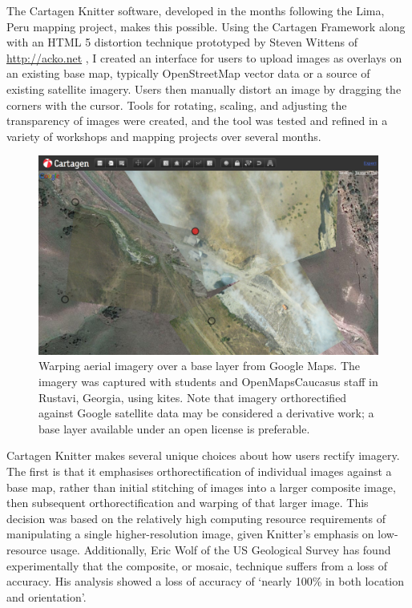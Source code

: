 \documentclass[11pt,oneside,notitlepage]{report}
\begin{document}
The Cartagen Knitter software, developed in the months following the Lima, Peru mapping project, makes this possible. Using the Cartagen Framework along with an HTML 5 distortion technique prototyped by Steven Wittens of \href{acko.net}{http://acko.net} \cite{wittens2008projective}, I created an interface for users to upload images as overlays on an existing base map, typically OpenStreetMap vector data or a source of existing satellite imagery. Users then manually distort an image by dragging the corners with the cursor. Tools for rotating, scaling, and adjusting the transparency of images were created, and the tool was tested and refined in a variety of workshops and mapping projects over several months. 

\begin{figure}[h]
  \begin{center}
	\includegraphics[width=1\textwidth]{images/cartagen-in-action-rustavi.png}
	\caption{Warping aerial imagery over a base layer from Google Maps. The imagery was captured with students and OpenMapsCaucasus staff in Rustavi, Georgia, using kites. Note that imagery orthorectified against Google satellite data may be considered a derivative work; a base layer available under an open license is preferable.}
  \end{center}
\end{figure}

Cartagen Knitter makes several unique choices about how users rectify imagery. The first is that it emphasises orthorectification of individual images against a base map, rather than initial stitching of images into a larger composite image, then subsequent orthorectification and warping of that larger image. This decision was based on the relatively high computing resource requirements of manipulating a single higher-resolution image, given Knitter's emphasis on low-resource usage. Additionally, Eric Wolf of the US Geological Survey has found experimentally that the composite, or mosaic, technique suffers from a loss of accuracy. His analysis showed a loss of accuracy of `nearly 100\% in both location and orientation'. \cite{wolf2006lowcost}
\end{document}
